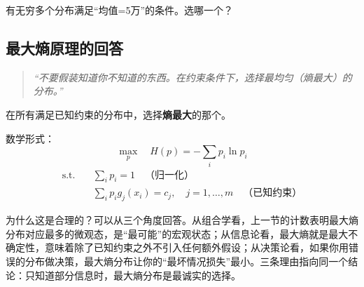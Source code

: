 有无穷多个分布满足“均值=5万”的条件。选哪一个？

\subsection{最大熵原理的回答}

\begin{quote}
\textit{“不要假装知道你不知道的东西。在约束条件下，选择最均匀（熵最大）的分布。”}
\end{quote}

\begin{keyformula}[title=最大熵原理]
在所有满足已知约束的分布中，选择\textbf{熵最大}的那个。

数学形式：
\begin{equation}
\max_{p} \quad H(p) = -\sum_i p_i \ln p_i
\end{equation}
\begin{align}
\text{s.t.} \quad & \sum_i p_i = 1 \quad \text{（归一化）} \\
& \sum_i p_i g_j(x_i) = c_j, \quad j = 1, \ldots, m \quad \text{（已知约束）}
\end{align}
\end{keyformula}

为什么这是合理的？可以从三个角度回答。从组合学看，上一节的计数表明最大熵分布对应最多的微观态，是“最可能”的宏观状态；从信息论看，最大熵就是最大不确定性，意味着除了已知约束之外不引入任何额外假设；从决策论看，如果你用错误的分布做决策，最大熵分布让你的“最坏情况损失”最小。三条理由指向同一个结论：只知道部分信息时，最大熵分布是最诚实的选择。


